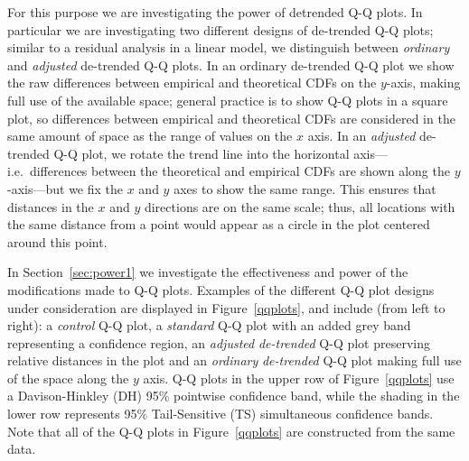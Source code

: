 \documentclass[12pt]{article}\usepackage[]{graphicx}\usepackage[]{color}
\newcommand{\hh}[1]{{\color{magenta} #1}}
\begin{document}
For this purpose we are investigating the power of detrended Q-Q plots. In particular
 we are investigating two different designs of de-trended Q-Q plots; 
similar to a residual analysis in a linear model, we distinguish between {\it ordinary} and {\it adjusted} de-trended Q-Q plots. In an ordinary de-trended Q-Q plot we show the raw differences between empirical and theoretical CDFs on the $y$-axis, making full use of the available space; general practice is to show Q-Q plots in a square plot, so differences between empirical and theoretical CDFs are considered in  the same amount of space as the range of values on the $x$ axis. 
In an {\it adjusted} de-trended Q-Q plot, we rotate the trend line into the horizontal axis---i.e.\ differences between the theoretical and empirical CDFs are shown along the $y$-axis---but we fix the $x$ and $y$ axes to show the same range. This ensures that distances in the $x$ and $y$ directions are on the same scale; thus, all locations with the same distance from a point would appear as a circle in the plot centered around this point.  




In Section~\ref{sec:power1} we investigate the effectiveness and power of the modifications made to Q-Q plots.
Examples of the different Q-Q plot designs under consideration are displayed in Figure~\ref{qqplots}, and include (from left to right): a \emph{control} Q-Q plot, a \emph{standard} Q-Q plot with an added grey band representing a confidence region, an \emph{adjusted} \emph{de-trended} Q-Q plot preserving relative distances in the plot and an \emph{ordinary} \emph{de-trended} Q-Q plot making full use of the space along the $y$ axis.
Q-Q plots in the upper row of Figure~\ref{qqplots} use a Davison-Hinkley (DH) 95\% pointwise confidence band, while the shading in the lower row represents 95\% Tail-Sensitive (TS) simultaneous confidence bands.
Note that all of the Q-Q plots in Figure~\ref{qqplots} are constructed from the same data. 
\end{document}
